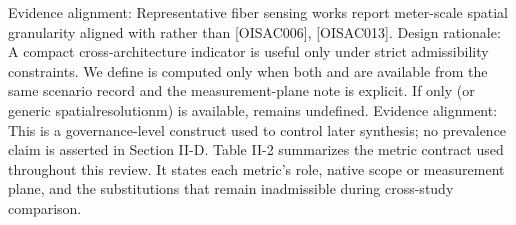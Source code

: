 {}Evidence alignment: Representative fiber sensing works report meter-scale spatial granularity aligned with  rather than  [O\markdownRendererUnderscore{}ISAC\markdownRendererUnderscore{}006], [O\markdownRendererUnderscore{}ISAC\markdownRendererUnderscore{}013].\markdownRendererInterblockSeparator
{}
\markdownRendererSectionEnd \markdownRendererSectionBegin
{}\markdownRendererInterblockSeparator
{}Design rationale: A compact cross-architecture indicator is useful only under strict admissibility constraints.\markdownRendererParagraphSeparator
{}We define\markdownRendererSoftLineBreak
{}\markdownRendererSoftLineBreak
{} is computed only when both  and  are available from the same scenario record and the measurement-plane note is explicit. If only  (or generic spatial\markdownRendererUnderscore{}resolution\markdownRendererUnderscore{}m) is available,  remains undefined.\markdownRendererParagraphSeparator
{}Evidence alignment: This is a governance-level construct used to control later synthesis; no prevalence claim is asserted in Section II-D.\markdownRendererParagraphSeparator
{}Table II-2 summarizes the metric contract used throughout this review. It states each metric's role, native scope or measurement plane, and the substitutions that remain inadmissible during cross-study comparison.\markdownRendererParagraphSeparator
{}\markdownRendererInterblockSeparator
